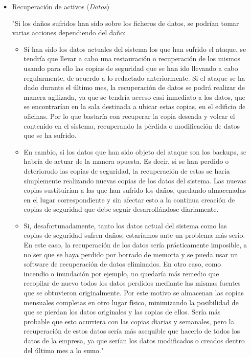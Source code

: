 \documentclass[a4paper,11pt,bibtotoc,noliststotoc]{scrbook}
\begin{document}
\begin{itemize}
\begin{itemize}
\item Recuperación de activos (\emph{Datos})

"Si los daños sufridos han sido sobre los ficheros de datos, se podrían tomar varias acciones dependiendo del daño:

	\begin{itemize}
	\item Si han sido los datos actuales del sistema los que han sufrido el ataque, se tendría que llevar a cabo una restauración o recuperación de los mismos usando para ello las copias de seguridad que se han ido llevando a cabo regularmente, de acuerdo a lo redactado anteriormente. Si el ataque se ha dado durante el último mes, la recuperación de datos se podrá realizar de manera agilizada, ya que se tendría acceso casi inmediato a los datos, que se encontrarían en la sala destinada a ubicar estas copias, en el edificio de oficinas. Por lo que bastaría con recuperar la copia deseada y volcar el contenido en el sistema, recuperando la pérdida o modificación de datos que se ha sufrido.
	\item En cambio, si los datos que han sido objeto del ataque son los backups, se habría de actuar de la manera opuesta. Es decir, si se han perdido o deteriorado las copias de seguridad, la recuperación de estas se haría simplemente realizando nuevas copias de los datos del sistema. Las nuevas copias sustituirían a las que han sufrido los daños, quedando almacenadas en el lugar correspondiente y sin afectar esto a la continua creación de copias de seguridad que debe seguir desarrollándose diariamente.
	\item Si, desafortunadamente, tanto los datos actual del sistema como las copias de seguridad sufren daños, estaríamos ante un problema más serio. En este caso, la recuperación de los datos sería prácticamente imposible, a no ser que se haya perdido por borrado de memoria y se pueda usar un software de recuperación de datos eliminados. En otro caso, como incendio o inundación por ejemplo, no quedaría más remedio que recopilar de nuevo todos los datos perdidos mediante las mismas fuentes que se obtuvieron originalmente. Por este motivo se almacenan las copias mensuales completas en otro lugar físico, minimizando la posibilidad de que se pierdan los datos originales y las copias de ellos. Sería más probable que esto ocurriera con las copias diarias y semanales, pero la recuperación de estos datos sería más asequible que hacerlo de todos los datos de la empresa, ya que serían los datos modificados o creados dentro del último mes a lo sumo."
	\end{itemize}


\end{itemize}
\end{itemize}
\end{document}
